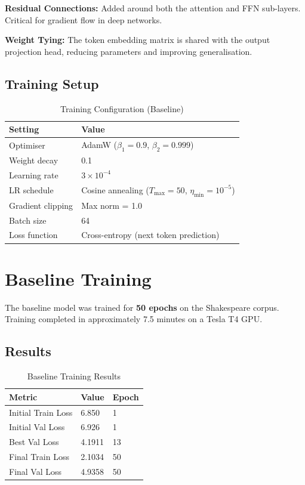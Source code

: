 \documentclass[12pt,a4paper]{article}
\begin{document}
\textbf{Residual Connections:} Added around both the attention and FFN sub-layers. Critical for gradient flow in deep networks.

\textbf{Weight Tying:} The token embedding matrix is shared with the output projection head, reducing parameters and improving generalisation.

\subsection{Training Setup}

\begin{table}[H]
\centering
\caption{Training Configuration (Baseline)}
\begin{tabular}{ll}
  \toprule
  \textbf{Setting} & \textbf{Value} \\
  \midrule
  Optimiser          & AdamW ($\beta_1=0.9$, $\beta_2=0.999$) \\
  Weight decay       & 0.1 \\
  Learning rate      & $3 \times 10^{-4}$ \\
  LR schedule        & Cosine annealing ($T_{\max}=50$, $\eta_{\min}=10^{-5}$) \\
  Gradient clipping  & Max norm = 1.0 \\
  Batch size         & 64 \\
  Loss function      & Cross-entropy (next token prediction) \\
  \bottomrule
\end{tabular}
\end{table}

\section{Baseline Training}

The baseline model was trained for \textbf{50 epochs} on the Shakespeare corpus. Training completed in approximately 7.5 minutes on a Tesla T4 GPU.

\subsection{Results}

\begin{table}[H]
\centering
\caption{Baseline Training Results}
\begin{tabular}{lll}
  \toprule
  \textbf{Metric} & \textbf{Value} & \textbf{Epoch} \\
  \midrule
  Initial Train Loss  & 6.850 & 1 \\
  Initial Val Loss    & 6.926 & 1 \\
  Best Val Loss       & 4.1911 & 13 \\
  Final Train Loss    & 2.1034 & 50 \\
  Final Val Loss      & 4.9358 & 50 \\
  \bottomrule
\end{tabular}
\end{table}
\end{document}

